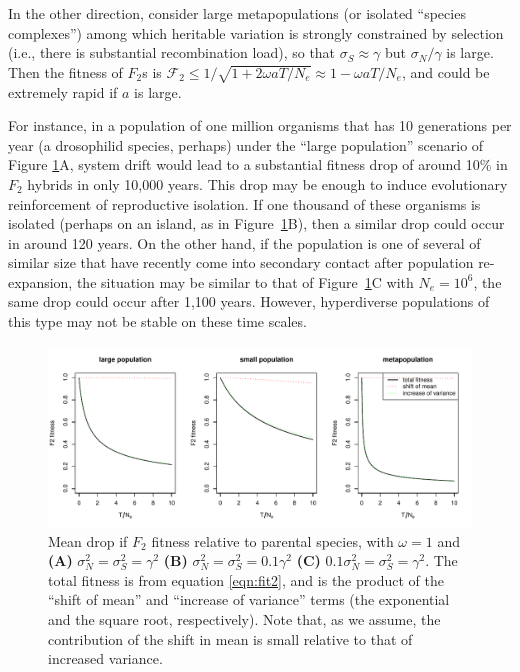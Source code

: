 \documentclass{article}
\newcommand{\1}{\mathbbm{1}}
\newcommand{\fit}{\mathcal{F}}
\begin{document}
In the other direction, consider large metapopulations (or isolated ``species complexes'')
among which heritable variation is strongly constrained by selection
(i.e., there is substantial recombination load),
so that $\sigma_S \approx \gamma$ but $\sigma_N/\gamma$ is large.
Then the fitness of $F_2$s is $\fit_2 \le 1/\sqrt{1 + 2 \omega a T/N_e} \approx 1 - \omega a T/N_e$,
and could be extremely rapid if $a$ is large.

For instance, in a population of one million organisms that has 10 generations per year (a drosophilid species, perhaps)
under the ``large population'' scenario of Figure \ref{fig:speciation_rates}A,
system drift would lead to a substantial fitness drop of around 10\% in $F_2$ hybrids in only 10,000 years.
This drop may be enough to induce evolutionary reinforcement of reproductive isolation.
If one thousand of these organisms is isolated (perhaps on an island, as in Figure~\ref{fig:speciation_rates}B),
then a similar drop could occur in around 120 years.
On the other hand, if the population is one of several of similar size
that have recently come into secondary contact after population re-expansion,
the situation may be similar to that of Figure~\ref{fig:speciation_rates}C with $N_e = 10^6$,
the same drop could occur after 1,100 years.
However, hyperdiverse populations of this type may not be stable on these time scales.


\begin{figure}[H]
\label{fig:speciation_rates}
\begin{center}
\includegraphics{speciation_rates}
\caption{
Mean drop if $F_2$ fitness relative to parental species,
with $\omega=1$ and 
\textbf{(A)} $\sigma_N^2 = \sigma_S^2 = \gamma^2$
\textbf{(B)} $\sigma_N^2 = \sigma_S^2 = 0.1 \gamma^2$
\textbf{(C)} $0.1 \sigma_N^2 = \sigma_S^2 = \gamma^2$.
The total fitness is from equation \eqref{eqn:fit2},
and is the product of the ``shift of mean'' and ``increase of variance'' terms
(the exponential and the square root, respectively).
Note that, as we assume, the contribution of the shift in mean
is small relative to that of increased variance.
\label{fig:speciation_rates}}
\end{center}
\end{figure}
\end{document}
